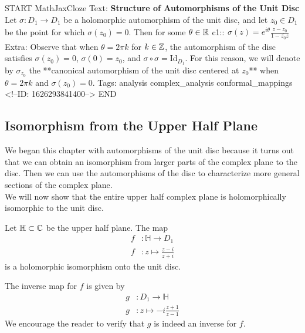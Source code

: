 \documentclass{memoir}
\begin{document}
\begin{anki}
START
MathJaxCloze
Text: \textbf{Structure of Automorphisms of the Unit Disc}
Let \(\sigma :D_1\to D_1\) be a holomorphic automorphism of the unit disc, and let \(z_0\in D_1\) be the point for which \(\sigma (z_0 )=0\). Then for some \(\theta \in \mathbb{R}\)
 {{c1::\(\begin{align*}
        	\sigma (z) = e^{i\theta } \frac{z-z_0}{1-\overline{z_0}z}
        \end{align*}\)}} 
Extra: Observe that when \(\theta =2\pi k\) for \(k \in \mathbb{Z}\), the automorphism of the disc satisfies \(\sigma (z_0) = 0\), \(\sigma (0) = z_0\), and \(\sigma \circ \sigma  = \textrm{Id}_{D_1}\). For this reason, we will denote by \(\sigma_{z_0}\) the **canonical automorphism of the unit disc centered at \(z_0\)** when \(\theta =2\pi k\) and \(\sigma (z_0)=0\).
Tags: analysis complex_analysis conformal_mappings
<!--ID: 1626293841400-->
END
\end{anki}

\subsection{Isomorphism from the Upper Half Plane}
\label{sub:isomorphism_from_the_upper_half_plane}

We began this chapter with automorphisms of the unit disc because it turns out that we can obtain an isomorphism from larger parts of the complex plane to the disc. Then we can use the automorphisms of the disc to characterize more general sections of the complex plane.\\

We will now show that the entire upper half complex plane is holomorphically isomorphic to the unit disc.

\begin{thm}
	Let \(\mathbb{H}\subset \mathbb{C}\) be the upper half plane. The map
	\begin{align*}
		f&:\mathbb{H} \to D_1\\
		f&:z \mapsto \frac{z-i}{z+i}
	\end{align*}
	is a holomorphic isomorphism onto the unit disc.
\end{thm}
The inverse map for \(f\) is given by
\begin{align*}
	g&:D_1 \to \mathbb{H}\\
	g&:z\mapsto -i\frac{z+1}{z-1}
\end{align*}
We encourage the reader to verify that \(g\) is indeed an inverse for \(f\).
\end{document}
